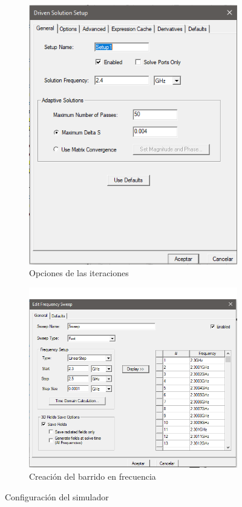 \begin{figure}[H]
\begin{subfigure}[b]{0.35\textwidth}
         \includegraphics[width=\textwidth]{archivos/desarrollo/9b}
         \caption{Opciones de las iteraciones}
         \label{fig:configb}
     \end{subfigure}
     \hfill
     \begin{subfigure}[b]{0.48\textwidth}
         \centering
         \includegraphics[width=\textwidth]{archivos/desarrollo/9c}
         \caption{Creación del barrido en frecuencia}
         \label{fig:configc}
     \end{subfigure}
     \hfill
        \caption{Configuración del simulador}
        \label{fig:config}
\end{figure}

